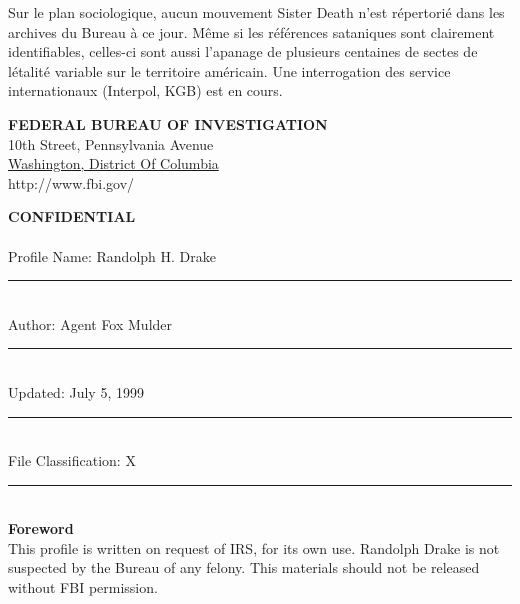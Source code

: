 \documentclass[11pt,twoside,a4paper]{book}
\begin{document}
Sur le plan sociologique, aucun mouvement Sister Death n'est r{\'e}pertori{\'e} dans les archives du Bureau {\`a} ce jour. M{\^e}me si les r{\'e}f{\'e}rences sataniques sont clairement identifiables, celles-ci sont aussi l'apanage de plusieurs centaines de sectes de l{\'e}talit{\'e} variable sur le territoire am{\'e}ricain. Une interrogation des service internationaux (Interpol, KGB) est en cours. ~\\

\clearpage

\begin{center}
\textbf{\Huge FEDERAL BUREAU OF INVESTIGATION}~\\
10th Street, Pennsylvania Avenue ~\\
\underline{Washington, District Of Columbia} ~\\
http://www.fbi.gov/ ~\\
\end{center}


\textbf{\LARGE CONFIDENTIAL}~\\~\\

Profile Name: Randolph H. Drake
\hrule~\\ %
Author: Agent Fox Mulder
\hrule~\\ %
Updated: July 5, 1999
\hrule~\\ %
File Classification: X
\hrule~\\ %

\textbf{Foreword}~\\
This profile is written on request of IRS, for its own use. Randolph Drake is not suspected by the Bureau of any felony. This materials should not be released without FBI permission. ~\\~\\
\end{document}
